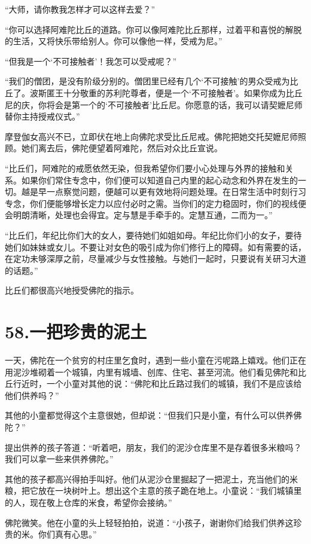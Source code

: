 \documentclass[12pt,twoside,openany]{book}
\begin{document}
“大师，请你教我怎样才可以这样去爱？”

“你可以选择阿难陀比丘的道路。你可以像阿难陀比丘那样，过着平和喜悦的解脱的生活，又将快乐带给别人。你可以像他一样，受戒为尼。”

“但我是一个‘不可接触者’！我怎可以受戒呢？”

“我们的僧团，是没有阶级分别的。僧团里已经有几个‘不可接触’的男众受戒为比丘了。波斯匿王十分敬重的苏利陀尊者，便是一个‘不可接触者’。如果你成为比丘尼的庆，你将会是第一个的‘不可接触者’比丘尼。你愿意的话，我可以请契嬷尼师替你主持授戒仪式。”

摩登伽女高兴不已，立即伏在地上向佛陀求受比丘尼戒。佛陀把她交托契嬷尼师照顾。她们离去后，佛陀便望着阿难陀，然后对众比丘宣说。

“比丘们，阿难陀的戒愿依然无染，但我希望你们要小心处理与外界的接触和关系。如果你们常住专念中，你们便可以知道自己内里的起心动念和外界在发生的一切。越是早一点察觉问题，便越可以更有效地将问题处理。在日常生活中时刻行习专念，你们便能够增长定力以应付必时之需。当你们的定力稳固时，你们的视线便会明朗清晰，处理也会得宜。定与慧是手牵手的。定慧互通，二而为一。”

“比丘们，年纪比你们大的女人，要待她们如姐如母。年纪比你们小的女子，要待她们如妹妹或女儿。不要让对女色的吸引成为你们修行上的障碍。如有需要的话，在定功未够深厚之前，尽量减少与女性接触。与她们一起时，只要说有关研习大道的话题。”

比丘们都很高兴地授受佛陀的指示。


\chapter{58.一把珍贵的泥土}\label{ch58}

一天，佛陀在一个贫穷的村庄里乞食时，遇到一些小童在污呢路上嬉戏。他们正在用泥沙堆砌着一个城镇，内里有城墙、创库、住宅、甚至河流。他们看见佛陀和比丘行近时，一个小童对其他的说：“佛陀和比丘路过我们的城镇，我们不是应该给他们供养吗？”

其他的小童都觉得这个主意很她，但却说：“但我们只是小童，有什么可以供养佛陀？”

提出供养的孩子答道：“听着吧，朋友，我们的泥沙仓库里不是存着很多米粮吗？我们可以拿一些来供养佛陀。”

其他的孩子都高兴得拍手叫好。他们从泥沙仓里掘起了一把泥土，充当他们的米粮，把它放在一块树叶上。想出这个主意的孩子跪在地上。小童说：“我们城镇里的人，现在敬上仓库的米食，希望你会接纳。”

佛陀微笑。他在小童的头上轻轻拍拍，说道：“小孩子，谢谢你们给我们供养这珍贵的米。你们真有心思。”
\end{document}
